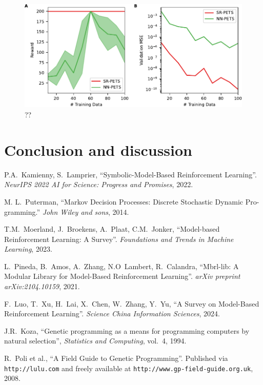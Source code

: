 \documentclass[11pt]{article}
\begin{document}
\begin{figure}
	\centering
	\includegraphics{cartpole.pdf}
	\caption{??}
	\label{fig: cartpole}
\end{figure}


\section{Conclusion and discussion}



\begin{thebibliography}{10}
	P.A.~Kamienny, S.~Lamprier, ``Symbolic-Model-Based Reinforcement Learning''.
	{\em NeurIPS 2022 AI for Science: Progress and Promises}, 2022.
	
	M. L.~Puterman, ``Markov Decision Processes: Discrete Stochastic Dynamic Pro-
	gramming.'' {\em John Wiley and sons}, 2014.
	
	T.M.~Moerland, J.~Broekens, A.~Plaat, C.M.~Jonker, ``Model-based Reinforcement Learning: A Survey''. {\em Foundations and Trends in Machine Learning}, 2023.
	
	L.~Pineda, B.~Amos, A.~Zhang, N.O~Lambert, R.~Calandra, ``Mbrl-lib: A Modular Library for Model-Based Reinforcement Learning''. {\em arXiv preprint arXiv:2104.10159}, 2021.
	
	F.~Luo, T.~Xu, H.~Lai, X.~Chen, W.~Zhang, Y.~Yu, ``A Survey on Model-Based Reinforcement Learning''. {\em Science China Information Sciences}, 2024.
	
	J.R.~Koza, ``Genetic programming as a means for programming computers by natural selection'', 
	{\em Statistics and Computing}, vol.~4, 1994.
	
	R.~Poli et al., ``A Field Guide to Genetic Programming''.
	\newblock Published via \texttt{http://lulu.com} and freely available at \texttt{http://www.gp-field-guide.org.uk}, 2008.
	
\end{thebibliography}
\end{document}
